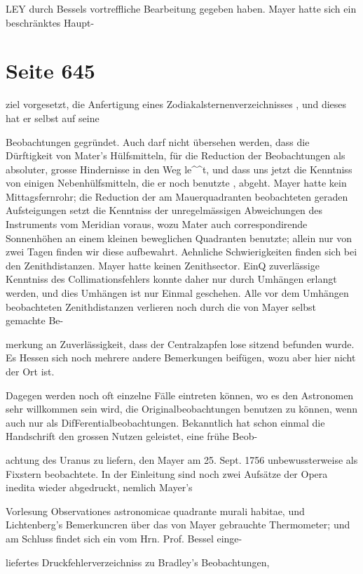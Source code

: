 \documentclass[10pt,a4paper]{article}
\begin{document}
LEY durch Bessels vortreffliche Bearbeitung gegeben haben. Mayer hatte sich ein beschränktes Haupt-


\newpage
\section*{Seite 645}
ziel vorgesetzt, die Anfertigung eines Zodiakalsternenverzeichnisses , und dieses hat er selbst auf seine

Beobachtungen gegründet. Auch darf nicht übersehen werden, dass die Dürftigkeit von Mater's Hülfsmitteln, für die Reduction der Beobachtungen als absoluter, grosse Hindernisse in den Weg le\textasciicircum{}\textasciicircum{}t, und dass uns jetzt die Kenntniss von einigen Nebenhülfsmitteln, die er noch benutzte , abgeht. Mayer hatte kein Mittagsfernrohr; die Reduction der am Mauerquadranten beobachteten geraden Aufsteigungen setzt die Kenntniss der unregelmässigen Abweichungen des Instruments vom Meridian voraus, wozu Mater auch correspondirende Sonnenhöhen an einem kleinen beweglichen Quadranten benutzte; allein nur von zwei Tagen finden wir diese aufbewahrt. Aehnliche Schwierigkeiten finden sich bei den Zenithdistanzen. Mayer hatte keinen Zenithsector. EinQ zuverlässige Kenntniss des Collimationsfehlers konnte daher nur durch Umhängen erlangt werden, und dies Umhängen ist nur Einmal geschehen. Alle vor dem Umhängen beobachteten Zenithdistanzen verlieren noch durch die von Mayer selbst gemachte Be-

merkung an Zuverlässigkeit, dass der Centralzapfen lose sitzend befunden wurde. Es Hessen sich noch mehrere andere Bemerkungen beifügen, wozu aber hier nicht der Ort ist.

Dagegen werden noch oft einzelne Fälle eintreten können, wo es den Astronomen sehr willkommen sein wird, die Originalbeobachtungen benutzen zu können, wenn auch nur als DifFerentialbeobachtungen. Bekanntlich hat schon einmal die Handschrift den grossen Nutzen geleistet, eine frühe Beob-

achtung des Uranus zu liefern, den Mayer am 25. Sept. 1756 unbewussterweise als Fixstern beobachtete. In der Einleitung sind noch zwei Aufsätze der Opera inedita wieder abgedruckt, nemlich Mayer's

Vorlesung Observationes astronomicae quadrante murali habitae, und Lichtenberg's Bemerkuncren über das von Mayer gebrauchte Thermometer; und am Schluss findet sich ein vom Hrn. Prof. Bessel einge-

liefertes Druckfehlerverzeichniss zu Bradley's Beobachtungen,
\end{document}
